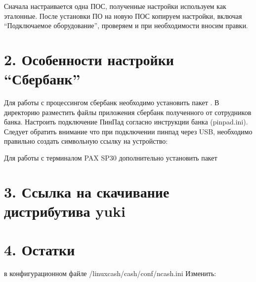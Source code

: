 \documentclass[a4paper,10pt,russian]{report}
\begin{document}
\sphinxAtStartPar
Сначала настраивается одна ПОС, полученные настройки используем как эталонные. После установки ПО на новую ПОС копируем настройки,
включая “Подключаемое оборудование”, проверяем и при необходимости вносим правки.


\section{2. Особенности настройки “Сбербанк”}
\label{\detokenize{additional:id3}}
\sphinxAtStartPar
Для работы с процессингом сбербанк необходимо установить пакет \sphinxhyphen{} .
В директорию  разместить файлы приложения сбербанк полученного от сотрудников банка. Настроить подключение ПинПад согласно инструкции банка (pinpad.ini). Следует обратить внимание что при подключении пинпад через USB, необходимо правильно создать символьную ссылку на устройство:

\begin{sphinxVerbatim}[commandchars=\\\{\}]
   
\end{sphinxVerbatim}

\sphinxAtStartPar
Для работы с терминалом PAX SP30 \sphinxhyphen{} дополнительно установить пакет 


\section{3. Ссылка на скачивание дистрибутива yuki}
\label{\detokenize{additional:yuki}}\begin{quote}

\sphinxAtStartPar
{}
\end{quote}


\section{4. Остатки}
\label{\detokenize{additional:id4}}
\sphinxAtStartPar
в конфигурационном файле /linuxcash/cash/conf/ncash.ini
Изменить:
\end{document}

